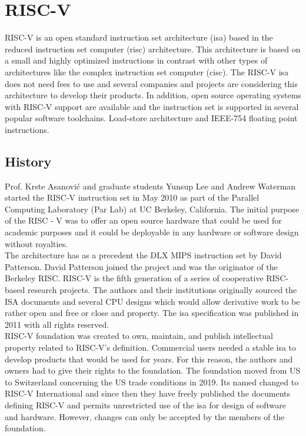 \section{RISC-V}

RISC-V is an open standard instruction set architecture (\gls{isa}) based in the reduced instruction set computer (\gls{risc}) architecture. This architecture is based on a small and highly optimized instructions in contrast with other types of architectures like the complex instruction set computer (\gls{cisc}). The RISC-V \gls{isa} does not need fees to use and several companies and projects  are considering this architecture to develop their products. In addition, open source operating systems with RISC-V support are available and the instruction set is supported in several popular software toolchains. Load-store architecture and IEEE-754 floating point instructions. \\

\subsection{History}

Prof. Krste Asanović and graduate students Yunsup Lee and Andrew Waterman started the RISC-V instruction set in May 2010 \cite{riscvh} as part of the Parallel Computing Laboratory (Par Lab) at UC Berkeley, California. The initial purpose of the RISC - V was to offer an open source hardware that could be used for academic purposes and it could be deployable in any hardware or software design without royalties.\\

The architecture has as a precedent the DLX MIPS instruction set by David Patterson. David Patterson joined the project and was the originator of the Berkeley RISC. RISC-V is the fifth generation of a series of cooperative RISC-based research projects. The authors and their institutions originally sourced the ISA documents and several CPU designs which would allow derivative work to be rather open and free or close and property. The \gls{isa} specification was published in 2011  with all rights reserved. \\

RISC-V foundation was created to own, maintain, and publish intellectual property related to RISC-V's definition. Commercial users needed a stable \gls{isa} to develop products that would be used for years. For this reason, the authors and owners had to give their rights to the foundation. The foundation moved from US to Switzerland concerning the US trade conditions in 2019. Its named changed to RISC-V International and since then they have freely published the documents defining RISC-V and permits unrestricted use of the \gls{isa} for design of software and hardware. However, changes can only be accepted by the members of the foundation. \\

